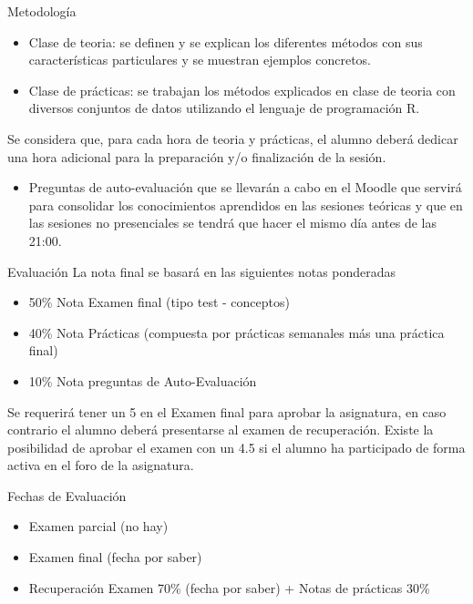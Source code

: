 \documentclass[
  ignorenonframetext,
]{beamer}
\providecommand{\tightlist}{%
  \setlength{\itemsep}{0pt}\setlength{\parskip}{0pt}}
\begin{document}
\begin{frame}{Metodología}
\protect\hypertarget{metodologuxeda}{}
\begin{itemize}
\item
  Clase de teoria: se definen y se explican los diferentes métodos con
  sus características particulares y se muestran ejemplos concretos.
\item
  Clase de prácticas: se trabajan los métodos explicados en clase de
  teoria con diversos conjuntos de datos utilizando el lenguaje de
  programación R.
\end{itemize}

Se considera que, para cada hora de teoria y prácticas, el alumno deberá
dedicar una hora adicional para la preparación y/o finalización de la
sesión.

\begin{itemize}
\tightlist
\item
  Preguntas de auto-evaluación que se llevarán a cabo en el Moodle que
  servirá para consolidar los conocimientos aprendidos en las sesiones
  teóricas y que en las sesiones no presenciales se tendrá que hacer el
  mismo día antes de las 21:00.
\end{itemize}
\end{frame}

\begin{frame}{Evaluación}
\protect\hypertarget{evaluaciuxf3n}{}
La nota final se basará en las siguientes notas ponderadas

\begin{itemize}
\tightlist
\item
  50\% Nota Examen final (tipo test - conceptos)
\item
  40\% Nota Prácticas (compuesta por prácticas semanales más una
  práctica final)
\item
  10\% Nota preguntas de Auto-Evaluación
\end{itemize}

Se requerirá tener un 5 en el Examen final para aprobar la asignatura,
en caso contrario el alumno deberá presentarse al examen de
recuperación. Existe la posibilidad de aprobar el examen con un 4.5 si
el alumno ha participado de forma activa en el foro de la asignatura.
\end{frame}

\begin{frame}{Fechas de Evaluación}
\protect\hypertarget{fechas-de-evaluaciuxf3n}{}
\begin{itemize}
\tightlist
\item
  Examen parcial (no hay)
\item
  Examen final (fecha por saber)
\item
  Recuperación Examen 70\% (fecha por saber) + Notas de prácticas 30\%
\end{itemize}
\end{frame}
\end{document}
